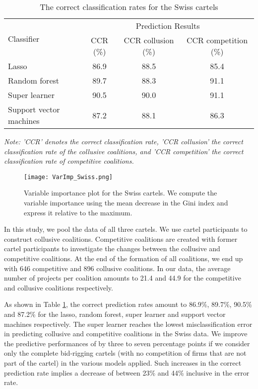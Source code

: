 \documentclass[a4paper,11pt]{article}
\begin{document}
	\begin{table}[ht]
		\caption{The correct classification rates for the Swiss cartels}\label{CCRSwisscart}
		\begin{center}
			\begin{tabular}{lccc}
				\hline
				\multirow{2}{*}{Classifier} & \multicolumn{3}{c}{Prediction Results}               \\ \cline{2-4} 
				& CCR (\%) & CCR collusion (\%) & CCR competition (\%) \\ \hline
				Lasso                       & 86.9    & 88.5              & 85.4                \\
				Random   forest             & 89.7    & 88.3              & 91.1                \\
				Super learner               & 90.5    & 90.0              & 91.1                \\
				Support   vector machines   & 87.2    & 88.1              & 86.3                \\ \hline
			\end{tabular}
		\end{center}
		\par
		\textit{Note: 'CCR' denotes the correct classification rate, 'CCR collusion' the correct classification rate of the collusive coalitions, and 'CCR competition' the correct classification rate of competitive coalitions.}
	\end{table}
	
	\begin{figure}[!htp]
		\centering \caption{\label{VarImp_Swiss} Variable importance plot for the Swiss cartels. We compute the variable importance using the mean decrease in the Gini index and express it relative to the maximum.}
		\texttt{[image: VarImp\_Swiss.png]}
	\end{figure}
	
	In this study, we pool the data of all three cartels. We use cartel participants to construct collusive coalitions. Competitive coalitions are created with former cartel participants to investigate the changes between the collusive and competitive coalitions. At the end of the formation of all coalitions, we end up with 646 competitive and 896 collusive coalitions. In our data, the average number of projects per coalition amounts to 21.4 and 44.9 for the competitive and collusive coalitions respectively.
	
	As shown in Table \ref{CCRSwisscart}, the correct prediction rates amount to 86.9\%, 89.7\%, 90.5\% and 87.2\% for the lasso, random forest, super learner and support vector machines respectively. The super learner reaches the lowest misclassification error in predicting collusive and competitive coalitions in the Swiss data. We improve the predictive performances of \cite{wallimann2020machine} by three to seven percentage points if we consider only the complete bid-rigging cartels (with no competition of firms that are not part of the cartel) in the various models applied. Such increases in the correct prediction rate implies a decrease of between 23\% and 44\% inclusive in the error rate.
	
\end{document}
